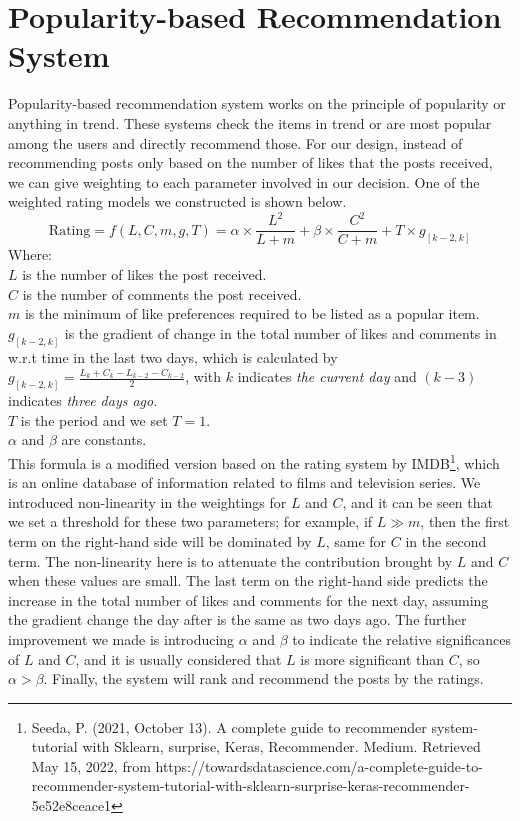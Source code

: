 \section{Popularity-based Recommendation System}
Popularity-based recommendation system works on the principle of popularity or anything in trend. These systems check the items in trend or are most popular among the users and directly recommend those. 
For our design, instead of recommending posts only based on the number of likes that the posts received, we can give weighting to each parameter involved in our decision. One of the weighted rating models we constructed is shown below.
\begin{equation*}
\text{Rating} = f(L,C,m,g,T) = \alpha \times \frac{L^{2}}{L+m} + \beta \times \frac{C^{2}}{C+m} + T \times g_{[k-2,k]}
\end{equation*}
Where:
\\$L$ is the number of likes the post received.
\\$C$ is the number of comments the post received.
\\$m$ is the minimum of like preferences required to be listed as a popular item.
\\$g_{[k-2,k]}$ is the gradient of change in the total number of likes and comments in w.r.t time in the last two days, which is calculated by 
$g_{[k-2,k]} = \frac{L_{k} + C_{k} -L_{k-2} -C_{k-2}}{2}$, with $k$ indicates \textit{the current day} and $(k-3)$ indicates \textit{three days ago}.
\\$T$ is the period and we set $T=1$.
\\ $\alpha$ and $\beta$ are constants.
\\This formula is a modified version based on the rating system by IMDB\footnote{Seeda, P. (2021, October 13). A complete guide to recommender system-tutorial with Sklearn, surprise, Keras, Recommender. Medium. Retrieved May 15, 2022, from https://towardsdatascience.com/a-complete-guide-to-recommender-system-tutorial-with-sklearn-surprise-keras-recommender-5e52e8ceace1}, which is an online database of information related to films and television series. We introduced non-linearity in the weightings for $L$ and $C$, and it can be seen that we set a threshold for these two parameters; for example, if $L \gg m$, then the first term on the right-hand side will be dominated by $L$, same for $C$ in the second term. The non-linearity here is to attenuate the contribution brought by $L$ and $C$ when these values are small. The last term on the right-hand side predicts the increase in the total number of likes and comments for the next day, assuming the gradient change the day after is the same as two days ago. The further improvement we made is introducing $\alpha$ and $\beta$ to indicate the relative significances of $L$ and $C$, and it is usually considered that $L$ is more significant than $C$, so $\alpha > \beta$. Finally, the system will rank and recommend the posts by the ratings.
